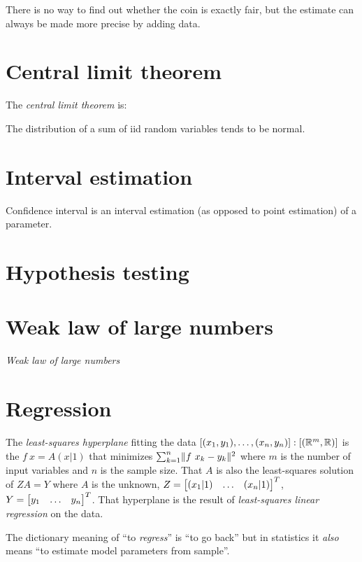 There is no way to find out whether the coin is exactly fair,
but the estimate can always be made more precise by adding data.

\section{Central limit theorem}

The \emph{central limit theorem} is:

The distribution of a sum of iid random variables tends to be normal.

\section{Interval estimation}

Confidence interval is an interval estimation (as opposed to point
estimation) of a parameter.

\section{Hypothesis testing}

\section{Weak law of large numbers}

\emph{Weak law of large numbers}

\section{Regression}

%
%
%
%
%
%
The \emph{least-squares hyperplane} fitting the data
\([(x_1,y_1),\ldots,(x_n,y_n)] : [(\mathbb{R}^m,\mathbb{R})]\)
is the \(f~x = A (x|1)\) that minimizes
\(\sum_{k=1}^n \lVert f~x_k - y_k\rVert^2 \)
where
\(m\) is the number of input variables
and \(n\) is the sample size.
That \(A\) is also the least-squares solution
of \(Z A = Y\)
where \(A\) is the unknown,
\(Z = \begin{bmatrix}(x_1|1) & \ldots & (x_n|1)\end{bmatrix}^T\),
\(Y = \begin{bmatrix}y_1 & \ldots & y_n\end{bmatrix}^T\).
That hyperplane is the result of
\emph{least-squares linear regression} on the data.

The dictionary meaning of
%
%
``to \emph{regress}'' is ``to go back''
but in statistics it \emph{also} means
``to estimate model parameters from sample''.

